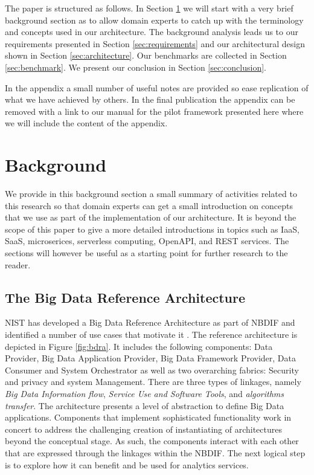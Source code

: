 The paper is structured as follows. In Section \ref{sec:background} we will start with a very brief background section as to allow domain experts to catch up with the terminology and concepts used in our architecture. The background analysis leads us to our requirements presented in Section \ref{sec:requirements} and our architectural design shown in Section \ref{sec:architecture}. Our benchmarks are collected in Section \ref{sec:benchmark}. We present our conclusion in Section \ref{sec:conclusion}.

In the appendix a small number of useful notes are provided so ease replication of what we have achieved by others. In the final publication the appendix can be removed with a link to our manual for the pilot framework presented here \cite{cloudmesh-manual, cloudmesh-openapi} where we will include the content of the appendix. 

\section{Background}
\label{sec:background}

We provide in this background section a small summary of activities related to this research so that domain experts can get a small introduction on concepts that we use as part of the implementation of our architecture. It is beyond the scope of this paper to give a more detailed introductions in topics such as IaaS, SaaS, microserices, serverless computing, OpenAPI, and REST services. The sections will however be useful as a starting point for further research to the reader. 

\subsection{The Big Data Reference Architecture}

NIST has developed a Big Data Reference Architecture as part of
NBDIF\cite{nist-v6} and identified a number of use cases that motivate
it \cite{nist-v3}. The reference architecture is depicted in Figure \ref{fig:bdra}. It includes the following components: Data Provider, Big Data Application Provider, Big Data Framework Provider, Data Consumer and
System Orchestrator as well as two overarching fabrics: Security and
privacy and system Management. There are three types of linkages,
namely \emph{Big Data Information flow}, \emph{Service Use and
  Software Tools}, and \emph{algorithms transfer}. The architecture
presents a level of abstraction to define Big Data
applications. Components that implement sophisticated functionality
work in concert to address the challenging creation of instantiating
of architectures beyond the conceptual stage. As such, the components
interact with each other that are expressed through the linkages
within the NBDIF.  The next logical step is to explore how it can
benefit and be used for analytics services.

